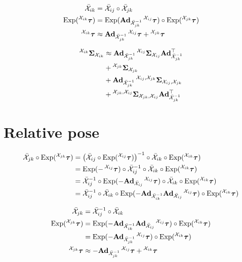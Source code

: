 \begin{align}
    \bar{\cX}_{ik} &= \bar{\cX}_{ij} \circ \bar{\cX}_{jk}\\
    \Exp(\prescript{\cX_{ik}}{}{\vectau}) &= \Exp(\mAd_{\bar{\cX}_{jk}^{-1}} \prescript{\cX_{ij}}{}{\vectau}) \circ \Exp(\prescript{\cX_{jk}}{}{\vectau})\\
    \prescript{\cX_{ik}}{}{\vectau} &\approx \mAd_{\bar{\cX}_{jk}^{-1}} \prescript{\cX_{ij}}{}{\vectau} + \prescript{\cX_{jk}}{}{\vectau}
\end{align}

\begin{align}
  \prescript{\cX_{ik}}{}{\matSigma}_{\cX_{ik}} &\approx \mAd_{\bar{\cX}_{jk}^{-1}} \prescript{\cX_{ij}}{}{\matSigma_{\cX_{ij}}} \mAd_{\bar{\cX}_{jk}^{-1}}\trans\\
    &+ \prescript{\cX_{jk}}{}{\matSigma_{\cX_{jk}}}\\
    &+ \mAd_{\bar{\cX}_{jk}^{-1}} \prescript{\cX_{ij}, \cX_{jk}}{}{\matSigma_{\cX_{ij}, \cX_{jk}}}\\
    &+ \prescript{\cX_{jk}, \cX_{ij}}{}{\matSigma_{\cX_{jk}, \cX_{ij}}} \mAd_{\bar{\cX}_{jk}^{-1}}\trans
\end{align}

\section{Relative pose}

\begin{subequations}
\begin{align}
    \bar{\cX}_{jk} \circ \Exp(\prescript{\cX_{jk}}{}{\vectau}) &= \left( \bar{\cX}_{ij} \circ \Exp(\prescript{\cX_{ij}}{}{\vectau}) \right)^{-1} \circ \bar{\cX}_{ik} \circ \Exp(\prescript{\cX_{ik}}{}{\vectau})\\
    &= \Exp(-\prescript{\cX_{ij}}{}{\vectau}) \circ \bar{\cX}_{ij}^{-1} \circ \bar{\cX}_{ik} \circ \Exp(\prescript{\cX_{ik}}{}{\vectau})\\
    &= \bar{\cX}_{ij}^{-1} \circ \Exp(- \mAd_{\bar{\cX}_{ij}} \prescript{\cX_{ij}}{}{\vectau}) \circ \bar{\cX}_{ik} \circ \Exp(\prescript{\cX_{ik}}{}{\vectau})\\
    &= \bar{\cX}_{ij}^{-1} \circ \bar{\cX}_{ik} \circ \Exp(- \mAd_{\bar{\cX}_{ik}^{-1}} \mAd_{\bar{\cX}_{ij}} \prescript{\cX_{ij}}{}{\vectau}) \circ \Exp(\prescript{\cX_{ik}}{}{\vectau})
\end{align}
\end{subequations}

\begin{align}
    \bar{\cX}_{jk} &= \bar{\cX}_{ij}^{-1} \circ \bar{\cX}_{ik}\\
    \Exp(\prescript{\cX_{jk}}{}{\vectau}) &= \Exp(- \mAd_{\bar{\cX}_{ik}^{-1}} \mAd_{\bar{\cX}_{ij}} \prescript{\cX_{ij}}{}{\vectau}) \circ \Exp(\prescript{\cX_{ik}}{}{\vectau})\\
    &= \Exp(- \mAd_{\bar{\cX}_{jk}^{-1}} \prescript{\cX_{ij}}{}{\vectau}) \circ \Exp(\prescript{\cX_{ik}}{}{\vectau})\\
    \prescript{\cX_{jk}}{}{\vectau} &\approx - \mAd_{\bar{\cX}_{jk}^{-1}} \prescript{\cX_{ij}}{}{\vectau} + \prescript{\cX_{ik}}{}{\vectau}
\end{align}

